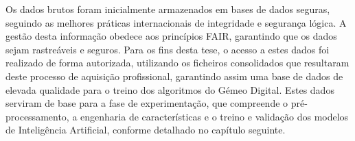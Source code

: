 Os dados brutos foram inicialmente armazenados em bases de dados seguras, seguindo as melhores práticas internacionais de integridade e segurança lógica. A gestão desta informação obedece aos princípios FAIR, garantindo que os dados sejam rastreáveis e seguros. Para os fins desta tese, o acesso a estes dados foi realizado de forma autorizada, utilizando os ficheiros consolidados que resultaram deste processo de aquisição profissional, garantindo assim uma base de dados de elevada qualidade para o treino dos algoritmos do Gémeo Digital. Estes dados serviram de base para a fase de experimentação, que compreende o pré-processamento, a engenharia de características e o treino e validação dos modelos de Inteligência Artificial, conforme detalhado no capítulo seguinte.